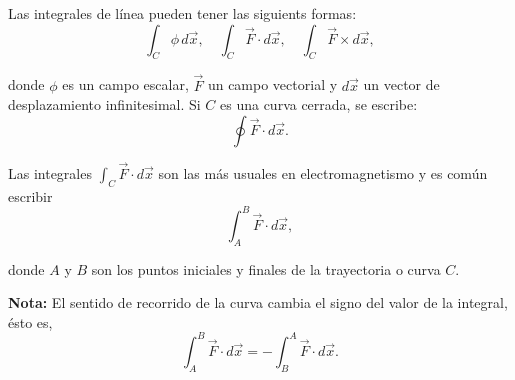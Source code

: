 Las integrales de línea pueden tener las siguients formas:
\begin{equation*}
\int_C \phi \, d\vec{x}, \quad \int_C \vec{F} \cdot d\vec{x}, \quad \int_C \vec{F} \times d\vec{x},
\end{equation*}

donde $\phi$ es un campo escalar, $\vec{F}$ un campo vectorial y $d\vec{x}$ un vector de desplazamiento infinitesimal. Si $C$ es una curva cerrada, se escribe: 
$$\oint \vec{F} \cdot d\vec{x}.$$

Las integrales $\int_C \vec{F} \cdot d\vec{x}$ son las más usuales en electromagnetismo y es común escribir
$$\int_A^B \Vec{F} \cdot d\vec{x},$$

donde $A$ y $B$ son los puntos iniciales y finales de la trayectoria o curva $C$.

\textbf{Nota:} El sentido de recorrido de la curva cambia el signo del valor de la integral, ésto es,
$$\int_A^B \Vec{F} \cdot d\Vec{x} = - \int_B^A \Vec{F} \cdot d\Vec{x}. $$

